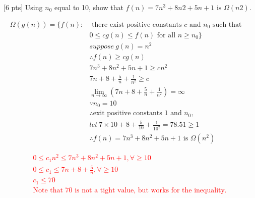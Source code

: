 \documentclass[12pt]{article}
\newenvironment{sol}[1][Solution]{\begin{trivlist}\item[\hskip\labelsep {\bfseries #1:}]}{\end{trivlist}}
\begin{document}
\begin{enumerate}
    \item \ [6 pts] Using $n_0$ equal to 10, show that $f(n) = 7n^3 + 8n2 + 5n + 1 \text{ is } \Omega(n2)$.
    \begin{sol}
    \begin{align*}
        \Omega(g(n)) = \{f(n): & \text{ there exist positive constants } c \text{ and } n_0 \text{ such that } \\ 
       & 0 \leq cg(n) \leq f(n) \text{ for all } n \geq n_0\}\\
       & suppose \ g(n) = n^2\\
       & \therefore f(n) \geq cg(n)\\
       & 7n^3 + 8n^2 + 5n+1 \geq cn^2 \\
       & 7n + 8 + \frac{5}{n} + \frac{1}{n^2} \geq c \\
       & \lim_{n \to \infty} (7n + 8 + \frac{5}{n} + \frac{1}{n^2}) = \infty  \\
       & \because n_0 = 10 \\ 
       & \therefore \text{exit positive constants } 1 \text{ and } n_0, \\
       & let \ 7 \times 10 + 8 + \frac{5}{10} + \frac{1}{10^2} = 78.51 \geq 1 \\
       & \therefore f(n) = 7n^3 + 8n^2 + 5n + 1 \text{ is } \Omega(n^2)
    \end{align*}

    \textcolor{red}{
    \begin{align*}
        & 0 \leq c_1n^2 \leq 7n^3 + 8 n^2 + 5n+1, \forall \geq 10 \\
        & 0 \leq c_1 \leq 7n + 8 + \frac{5}{n}, \forall \geq 10 \\
        & c_1 \leq 70 \\
        & \text{Note that 70 is not a tight value, but works for the inequality.}
    \end{align*}
    }
    \end{sol}
    

\end{enumerate}
\end{document}
